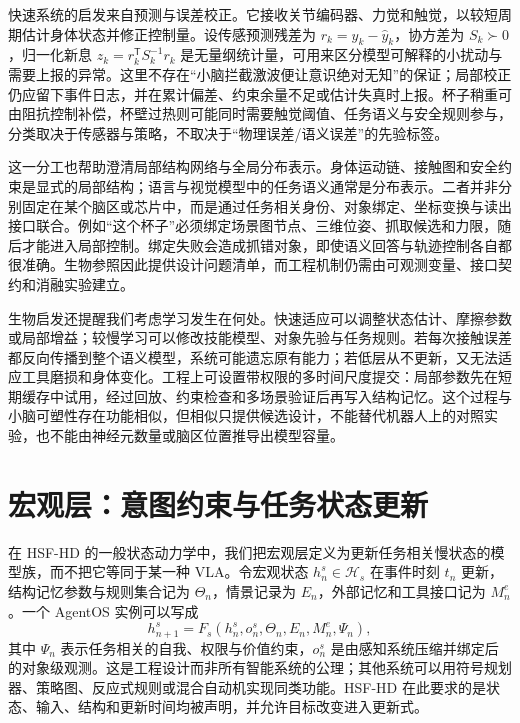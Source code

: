 快速系统的启发来自预测与误差校正。它接收关节编码器、力觉和触觉，以较短周期估计身体状态并修正控制量。设传感预测残差为 $r_k=y_k-\hat y_k$，协方差为 $S_k\succ0$，归一化新息 $z_k=r_k^\mathsf{T}S_k^{-1}r_k$ 是无量纲统计量，可用来区分模型可解释的小扰动与需要上报的异常。这里不存在“小脑拦截激波便让意识绝对无知”的保证；局部校正仍应留下事件日志，并在累计偏差、约束余量不足或估计失真时上报。杯子稍重可由阻抗控制补偿，杯壁过热则可能同时需要触觉阈值、任务语义与安全规则参与，分类取决于传感器与策略，不取决于“物理误差/语义误差”的先验标签。

这一分工也帮助澄清局部结构网络与全局分布表示。身体运动链、接触图和安全约束是显式的局部结构；语言与视觉模型中的任务语义通常是分布表示。二者并非分别固定在某个脑区或芯片中，而是通过任务相关身份、对象绑定、坐标变换与读出接口联合。例如“这个杯子”必须绑定场景图节点、三维位姿、抓取候选和力限，随后才能进入局部控制。绑定失败会造成抓错对象，即使语义回答与轨迹控制各自都很准确。生物参照因此提供设计问题清单，而工程机制仍需由可观测变量、接口契约和消融实验建立。

生物启发还提醒我们考虑学习发生在何处。快速适应可以调整状态估计、摩擦参数或局部增益；较慢学习可以修改技能模型、对象先验与任务规则。若每次接触误差都反向传播到整个语义模型，系统可能遗忘原有能力；若低层从不更新，又无法适应工具磨损和身体变化。工程上可设置带权限的多时间尺度提交：局部参数先在短期缓存中试用，经过回放、约束检查和多场景验证后再写入结构记忆。这个过程与小脑可塑性存在功能相似，但相似只提供候选设计，不能替代机器人上的对照实验，也不能由神经元数量或脑区位置推导出模型容量。

\section{宏观层：意图约束与任务状态更新}
\label{sec:macro_layer_vla}

在 HSF-HD 的一般状态动力学中，我们把宏观层定义为更新任务相关慢状态的模型族，而不把它等同于某一种 VLA。令宏观状态 $h^s_n\in\mathcal{H}_s$ 在事件时刻 $t_n$ 更新，结构记忆参数与规则集合记为 $\Theta_n$，情景记录为 $E_n$，外部记忆和工具接口记为 $M^e_n$。一个 AgentOS 实例可以写成
\begin{equation}
 h^s_{n+1}=F_s(h^s_n,o^s_n,\Theta_n,E_n,M^e_n,\Psi_n),
\end{equation}
其中 $\Psi_n$ 表示任务相关的自我、权限与价值约束，$o^s_n$ 是由感知系统压缩并绑定后的对象级观测。这是工程设计而非所有智能系统的公理；其他系统可以用符号规划器、策略图、反应式规则或混合自动机实现同类功能。HSF-HD 在此要求的是状态、输入、结构和更新时间均被声明，并允许目标改变进入更新式。

